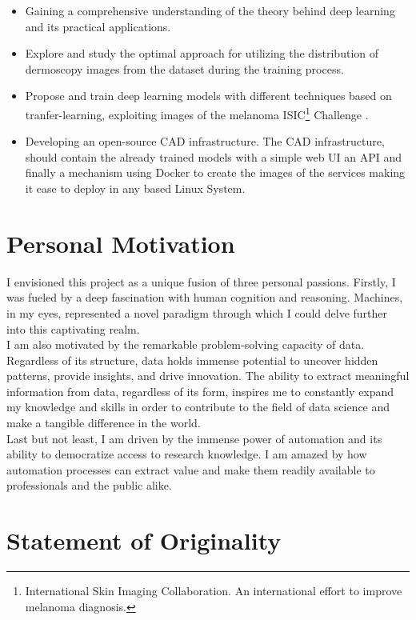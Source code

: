 \begin{itemize}
  \item Gaining a comprehensive understanding of the theory
    behind deep learning and its practical applications.
  \item Explore and study the optimal approach for utilizing the distribution
    of dermoscopy images from the dataset during the training process.
  \item Propose and train
    deep learning models with different techniques based on tranfer-learning,
    exploiting images of the melanoma ISIC\footnote{International Skin Imaging
    Collaboration. An international effort to improve melanoma diagnosis.}
    Challenge \cite{IsicChallenge}.
  \item Developing an open-source CAD infrastructure. The CAD infrastructure, should contain
    the already trained models with a simple web UI an API and finally a
    mechanism using Docker to create the images of the services making it ease
    to deploy in any based Linux System.
\end{itemize}

\section{Personal Motivation}

I envisioned this project as a unique fusion of three personal passions.
Firstly, I was fueled by a deep fascination with human cognition and reasoning.
Machines, in my eyes, represented a novel paradigm through which I could delve
further into this captivating realm. \\

I am also motivated by the remarkable problem-solving capacity of data.
Regardless of its structure, data holds immense potential to uncover hidden
patterns, provide insights, and drive innovation. The ability to extract
meaningful information from data, regardless of its form, inspires me to
constantly expand my knowledge and skills in order to contribute to the field
of data science and make a tangible difference in the world. \\

Last but not least, I am driven by the immense power of automation and its
ability to democratize access to research knowledge. I am amazed by how
automation processes can extract value and make them readily available to
professionals and the public alike.

\section{Statement of Originality}

